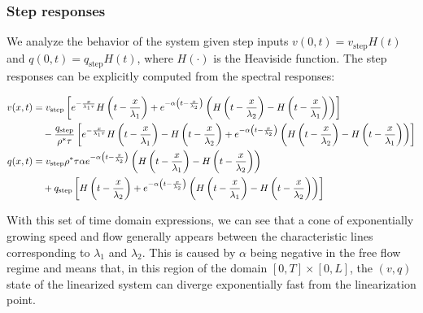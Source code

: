 \documentclass[preprint]{elsarticle}
\begin{document}
\subsubsection{Step responses}
We analyze the behavior of the system given step inputs $v(0,t)=v_{\text{step}}H(t)$ and $q(0,t)=q_{\text{step}}H(t)$, where $H(\cdot)$ is the Heaviside function. The step responses can be explicitly computed from the spectral responses:

\begin{align} 
v(x,t) &= v_{\text{step}}
\left[
	e^{-\frac{x}{\lambda_{1}\tau}} H\left(t-\frac{x}{\lambda_{1}}\right)
	+
	e^{-\alpha \left(t - \frac{x}{\lambda_{2}} \right)}
	\left(
		H\left(t - \frac{x}{\lambda_{2}} \right) - H\left(t - \frac{x}{\lambda_{1}} \right)
	\right)
\right]
\notag \\
&\quad
- \dfrac{q_{\text{step}}}{\rho^* \tau}
\left[
	e^{-\frac{x}{\lambda_{1}\tau}} H\left(t-\frac{x}{\lambda_{1}}\right) - H\left(t - \frac{x}{\lambda_{2}} \right) +
	e^{-\alpha \left(t - \frac{x}{\lambda_{2}} \right)}
	\left(
		H\left(t - \frac{x}{\lambda_{2}} \right) - H\left(t - \frac{x}{\lambda_{1}} 	\right)
	\right)
\right] \\
	q(x,t) &= v_{\text{step}} \rho^*\tau \alpha e^{-\alpha \left(t - \frac{x}{\lambda_{2}} \right)}
		\left(
		H\left(t - \frac{x}{\lambda_{1}} \right) - H\left(t - \frac{x}{\lambda_{2}} 	\right)
	\right)
\notag \\
&\quad+ 
q_{\text{step}}
\left[
H\left(t - \frac{x}{\lambda_{2}} \right) + e^{-\alpha \left(t - \frac{x}{\lambda_{2}} \right)}
		\left(
		H\left(t - \frac{x}{\lambda_{1}} \right) - H\left(t - \frac{x}{\lambda_{2}} 	\right)
	\right)
\right]
\end{align}

With this set of time domain expressions, we can see that a cone of exponentially growing speed and flow generally appears between the characteristic lines corresponding to $\lambda_{1}$ and $\lambda_{2}$. This is caused by $\alpha$ being negative in the free flow regime and means that, in this region of the domain $\left[0,T\right] \times \left[0,L\right]$, the $\left(v,q\right)$ state of the linearized system can diverge exponentially fast from the linearization point.
\end{document}
